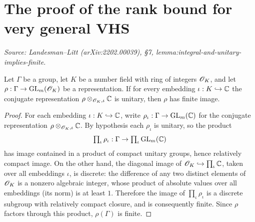 \section{The proof of the rank bound for very general VHS}

\begin{lemma}
  \label{lem:integral-and-unitary-implies-finite}
  \textit{Source: Landesman--Litt (arXiv:2202.00039), \S7,
    lemma:integral-and-unitary-implies-finite.}

  Let $\Gamma$ be a group, let $K$ be a number field with ring of integers
  $\mathscr{O}_K$, and let $\rho : \Gamma \to \operatorname{GL}_m(\mathscr{O}_K)$ be a representation. If for
  every embedding $\iota : K \hookrightarrow \mathbb{C}$ the conjugate representation
  $\rho \otimes_{\mathscr{O}_K, \iota} \mathbb{C}$ is unitary, then $\rho$ has finite image.
\end{lemma}

\begin{proof}
  For each embedding $\iota : K \hookrightarrow \mathbb{C}$, write
  $\rho_\iota : \Gamma \to \operatorname{GL}_m(\mathbb{C})$ for the conjugate representation
  $\rho \otimes_{\mathscr{O}_K, \iota} \mathbb{C}$. By hypothesis each $\rho_\iota$ is unitary, so
  the product
  \[
    \textstyle\prod_\iota \rho_\iota : \Gamma \to \prod_\iota \operatorname{GL}_m(\mathbb{C})
  \]
  has image contained in a product of compact unitary groups, hence relatively
  compact image. On the other hand, the diagonal image of
  $\mathscr{O}_K \hookrightarrow \prod_\iota \mathbb{C}$, taken over all embeddings $\iota$, is
  discrete: the difference of any two distinct elements of $\mathscr{O}_K$ is a nonzero
  algebraic integer, whose product of absolute values over all embeddings (its
  norm) is at least $1$. Therefore the image of $\prod_\iota \rho_\iota$ is a
  discrete subgroup with relatively compact closure, and is consequently finite.
  Since $\rho$ factors through this product, $\rho(\Gamma)$ is finite.
\end{proof}

